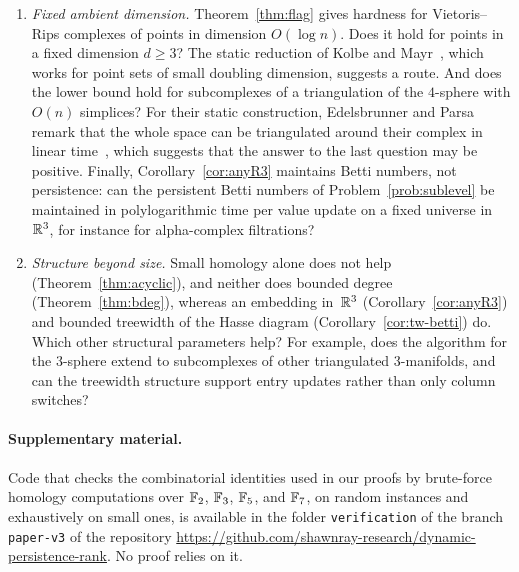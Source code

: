 \begin{enumerate}[leftmargin=*]
\item \emph{Fixed ambient dimension.}
Theorem~\ref{thm:flag} gives hardness for Vietoris--Rips complexes of points in dimension $O(\log n)$.
Does it hold for points in a fixed dimension $d\ge3$? The static reduction of Kolbe and Mayr~\cite{KM26}, which works for point sets of small doubling dimension, suggests a route.
And does the lower bound hold for subcomplexes of a triangulation of the $4$-sphere with $O(n)$ simplices?
For their static construction, Edelsbrunner and Parsa remark that the whole space can be triangulated around their complex in linear time~\cite{EP14}, which suggests that the answer to the last question may be positive.
Finally, Corollary~\ref{cor:anyR3} maintains Betti numbers, not persistence: can the persistent Betti numbers of Problem~\ref{prob:sublevel} be maintained in polylogarithmic time per value update on a fixed universe in~$\mathbb{R}^3$, for instance for alpha-complex filtrations?
\item \emph{Structure beyond size.}
Small homology alone does not help (Theorem~\ref{thm:acyclic}), and neither does bounded degree (Theorem~\ref{thm:bdeg}), whereas an embedding in~$\mathbb{R}^3$ (Corollary~\ref{cor:anyR3}) and bounded treewidth of the Hasse diagram (Corollary~\ref{cor:tw-betti}) do.
Which other structural parameters help?
For example, does the algorithm for the $3$-sphere extend to subcomplexes of other triangulated $3$-manifolds, and can the treewidth structure support entry updates rather than only column switches?
\end{enumerate}

\paragraph{Supplementary material.}
Code that checks the combinatorial identities used in our proofs by brute-force homology computations over $\mathbb{F}_2$, $\mathbb{F}_3$, $\mathbb{F}_5$, and $\mathbb{F}_7$, on random instances and exhaustively on small ones, is available in the folder \texttt{verification} of the branch \texttt{paper-v3} of the repository \url{https://github.com/shawnray-research/dynamic-persistence-rank}. No proof relies on it.
